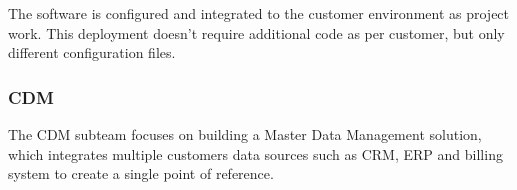 \documentclass[english]{tktltiki2}
\theoremstyle{definition}
\theoremstyle{remark}
\begin{document}

The software is configured and integrated to the customer environment as project work. This deployment doesn't require additional code as per customer, but only different configuration files. 

\subsubsection{CDM} 
The CDM subteam focuses on building a Master Data Management \cite{loshin2010master} solution, which integrates multiple customers data sources such as CRM, ERP and billing system to create a single point of reference. 
\end{document}
